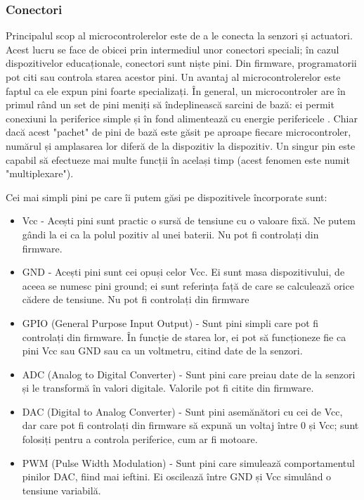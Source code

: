\subsubsection{Conectori}
\label{sec:embed-ics-micro-con}

Principalul scop al microcontrolerelor este de a le conecta la senzori și
actuatori. Acest lucru se face de obicei prin intermediul unor conectori
speciali; în cazul dispozitivelor educaționale, conectori sunt niște pini. Din
firmware, programatorii pot citi sau controla starea acestor pini. Un avantaj al
microcontrolerelor este faptul ca ele expun pini foarte specializați. În
general, un microcontroler are în primul rând un set de pini meniți să
îndeplinească sarcini de bază: ei permit conexiuni la periferice simple și în
fond alimentează cu energie perifericele . Chiar dacă acest "pachet" de pini de
bază este găsit pe aproape fiecare microcontroler, numărul și amplasarea lor
diferă de la dispozitiv la dispozitiv. Un singur pin este capabil să efectueze
mai multe funcții în același timp (acest fenomen este numit "multiplexare").

Cei mai simpli pini pe care îi putem găsi pe dispozitivele încorporate sunt:

\begin{itemize}
	\item Vcc - Acești pini sunt practic o sursă de tensiune cu o valoare
		fixă. Ne putem gândi la ei ca la polul pozitiv al unei baterii.
		Nu pot fi controlați din firmware.
	\item GND - Acești pini sunt cei opuși celor Vcc. Ei sunt masa
		dispozitivului, de aceea se numesc pini ground; ei sunt
		referința față de care se calculează orice cădere de tensiune.
		Nu pot fi controlați din firmware
	\item GPIO  (General Purpose
		Input Output) - Sunt pini simpli care pot fi controlați din
		firmware. În funcție de starea lor, ei pot să funcționeze fie ca
		pini Vcc sau GND sau ca un voltmetru, citind date de la senzori.
	\item ADC  (Analog to Digital
		Converter) - Sunt pini care preiau date de la senzori și le
		transformă în valori digitale. Valorile pot fi citite din
		firmware.
	\item DAC  (Digital to Analog
		Converter) - Sunt pini asemănători cu cei de Vcc, dar care pot
		fi controlați din firmware să expună un voltaj între 0 și Vcc;
		sunt folosiți pentru a controla periferice, cum ar fi motoare.
	\item PWM  (Pulse Width Modulation)
		- Sunt pini care simulează comportamentul pinilor DAC, fiind mai
		ieftini. Ei oscilează între GND și Vcc simulând o tensiune
		variabilă.
\end{itemize}

